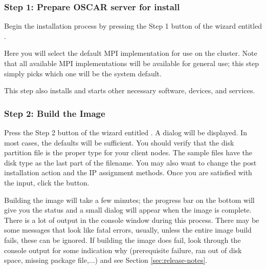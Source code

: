 
\subsubsection{Step 1: Prepare OSCAR server for install} 
\label{det:prepareforinstall}

Begin the installation process by pressing the Step 1 button of the
wizard entitled . 

Here you will select the default MPI implementation for use on the
cluster.  Note that all available MPI implementations will be
available for general use; this step simply picks which one will be
the system default.

This step also installs and starts other necessary software, devices,
and services.


\subsubsection{Step 2: Build the Image} 
\label{det:buildimage}

Press the Step 2 button of the wizard entitled . A dialog will be displayed. In most cases, the
defaults will be sufficient. You should verify that the disk partition
file is the proper type for your client nodes. The sample files have
the disk type as the last part of the filename. You may also want to
change the post installation action and the IP assignment methods.
  Once you are satisfied with the input, click the
 button.

Building the image will take a few minutes; the progress bar on the
bottom will give you the status and a small dialog will appear when
the image is complete.  There is a lot of output in the console window
during this process. There may be some messages that look like 
fatal errors, usually, unless the entire image build fails, these can 
be ignored. If building the image does fail, look through the console output
for some indication why (prerequisite failure, ran out of disk space, missing
package file,...) and see Section
\ref{sec:release-notes}.
  
